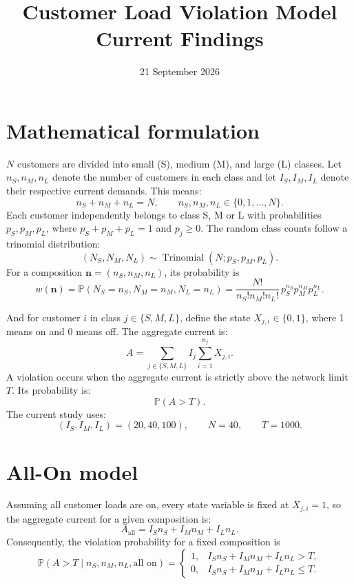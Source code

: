 \documentclass[11pt,a4paper]{article}
\title{Customer Load Violation Model\\\large Current Findings}
\author{}
\date{21 September 2026}
\newcommand{\Prob}{\mathbb{P}}
\begin{document}
\maketitle

\section{Mathematical formulation}

\(N\) customers are divided into small (S), medium (M), and large (L) classes.  Let
\(n_S,n_M,n_L\) denote the number of customers in each class and let
\(I_S,I_M,I_L\) denote their respective current demands.  This means: 
\begin{equation}
    n_S+n_M+n_L=N, \qquad n_S,n_M,n_L\in\{0,1,\ldots,N\}.
\end{equation}
Each customer independently belongs to class S, M or L with probabilities
\(p_S,p_M,p_L\), where \(p_S+p_M+p_L=1\) and \(p_j\geq0\).
The random class counts follow a trinomial distribution:
\begin{equation}
    (N_S,N_M,N_L)\sim\operatorname{Trinomial}(N;p_S,p_M,p_L).
\end{equation}
For a composition \(\boldsymbol n=(n_S,n_M,n_L)\), its probability is
\begin{equation}
    w(\boldsymbol n)
    =\Prob(N_S=n_S,N_M=n_M,N_L=n_L)
    =\frac{N!}{n_S!n_M!n_L!}\,p_S^{n_S}p_M^{n_M}p_L^{n_L}.
\end{equation}

And for customer \(i\) in class \(j\in\{S,M,L\}\), define the state
\(X_{j,i}\in\{0,1\}\), where 1 means on and 0 means off.  The aggregate current is:
\begin{equation}
    A=\sum_{j\in\{S,M,L\}} I_j\sum_{i=1}^{n_j}X_{j,i}.
\end{equation}
A violation occurs when the aggregate current is strictly above the network
limit \(T\).  Its probability is:
\begin{equation}
    \Prob(A>T).
\end{equation}
The current study uses:
\begin{equation}
    (I_S,I_M,I_L)=(20,40,100),\qquad N=40,\qquad T=1000.
\end{equation}


\section{All-On model}

Assuming all customer loads are on, every state variable is fixed at
\(X_{j,i}=1\), so the aggregate current for a given composition is:
\begin{equation}
    A_{\mathrm{all}}=I_Sn_S+I_Mn_M+I_Ln_L.
\end{equation}
Consequently, the violation probability for a fixed composition is
\begin{equation}
    \Prob(A>T\mid n_S,n_M,n_L,\text{all on})=
    \begin{cases}
        1, & I_Sn_S+I_Mn_M+I_Ln_L>T,\\
        0, & I_Sn_S+I_Mn_M+I_Ln_L\leq T.
    \end{cases}
\end{equation}
\end{document}
